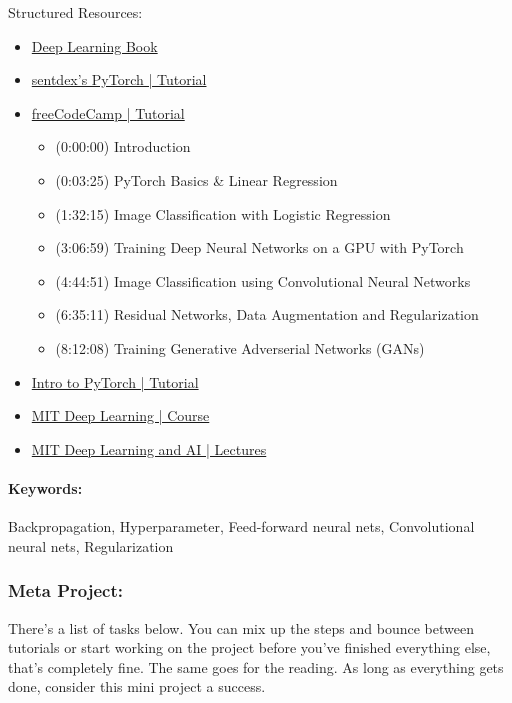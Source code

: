 Structured Resources:
\begin{itemize}
	\item
	\href{http://www.deeplearningbook.org/}{Deep Learning Book}

	\item
	\href{https://www.youtube.com/results?search_query=sentdex+pytorch+pt.+3}{sentdex's PyTorch | Tutorial}

	\item
	\href{https://youtu.be/GIsg-ZUy0MY}{freeCodeCamp | Tutorial}
	\begin{itemize}
		\item (0:00:00) Introduction
		\item (0:03:25) PyTorch Basics \& Linear Regression
		\item (1:32:15) Image Classification with Logistic Regression
		\item (3:06:59) Training Deep Neural Networks on a GPU with PyTorch
		\item (4:44:51) Image Classification using Convolutional Neural Networks
		\item (6:35:11) Residual Networks, Data Augmentation and Regularization
		\item (8:12:08) Training Generative Adverserial Networks (GANs)
	\end{itemize}

	\item
	\href{https://youtu.be/pWrwyOsho5A}{Intro to PyTorch | Tutorial}

	\item
	\href{http://introtodeeplearning.com/}{MIT Deep Learning | Course}

	\item
	\href{https://deeplearning.mit.edu/}{MIT Deep Learning and AI | Lectures}

\end{itemize}

\paragraph*{Keywords:} Backpropagation, Hyperparameter, Feed-forward neural nets, Convolutional neural nets, Regularization

\subsubsection*{Meta Project:}
There's a list of tasks below. You can mix up the steps and bounce between tutorials or start working on the project before you've finished everything else, that's completely fine. The same goes for the reading. As long as everything gets done, consider this mini project a success.

